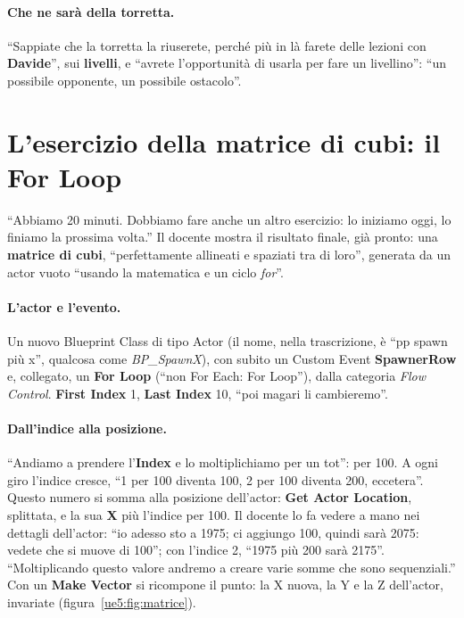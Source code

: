 \paragraph{Che ne sarà della torretta.} ``Sappiate che la torretta la riuserete, perché
più in là farete delle lezioni con \textbf{Davide}'', sui \textbf{livelli}, e ``avrete
l'opportunità di usarla per fare un livellino'': ``un possibile opponente, un possibile
ostacolo''.

\section{L'esercizio della matrice di cubi: il For Loop}
\label{ue5:sec:matrice}

``Abbiamo 20 minuti. Dobbiamo fare anche un altro esercizio: lo iniziamo oggi, lo
finiamo la prossima volta.'' Il docente mostra il risultato finale, già pronto: una
\textbf{matrice di cubi}, ``perfettamente allineati e spaziati tra di loro'', generata
da un actor vuoto ``usando la matematica e un ciclo \emph{for}''.

\paragraph{L'actor e l'evento.} Un nuovo Blueprint Class di tipo Actor (il nome, nella
trascrizione, è ``pp spawn più x'', qualcosa come \emph{BP\_SpawnX}), con subito un
Custom Event \textbf{SpawnerRow} e, collegato, un \textbf{For Loop} (``non For Each: For
Loop''), dalla categoria \emph{Flow Control}. \textbf{First Index} 1, \textbf{Last Index}
10, ``poi magari li cambieremo''.

\paragraph{Dall'indice alla posizione.} ``Andiamo a prendere l'\textbf{Index} e lo
moltiplichiamo per un tot'': per 100. A ogni giro l'indice cresce, ``1 per 100 diventa
100, 2 per 100 diventa 200, eccetera''. Questo numero si somma alla posizione
dell'actor: \textbf{Get Actor Location}, splittata, e la sua \textbf{X} più l'indice per
100. Il docente lo fa vedere a mano nei dettagli dell'actor: ``io adesso sto a 1975;
ci aggiungo 100, quindi sarà 2075: vedete che si muove di 100''; con l'indice 2, ``1975
più 200 sarà 2175''. ``Moltiplicando questo valore andremo a creare varie somme che sono
sequenziali.'' Con un \textbf{Make Vector} si ricompone il punto: la X nuova, la Y e la Z
dell'actor, invariate (figura~\ref{ue5:fig:matrice}).

